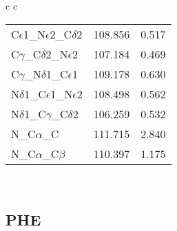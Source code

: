 \begin{longtable}{ c c }
\begin{tabular}{ l l l }
  C$\epsilon$1\_N$\epsilon$2\_C$\delta$2 & 108.856 & 0.517\\
  C$\gamma$\_C$\delta$2\_N$\epsilon$2 & 107.184 & 0.469\\
  C$\gamma$\_N$\delta$1\_C$\epsilon$1 & 109.178 & 0.630\\
  N$\delta$1\_C$\epsilon$1\_N$\epsilon$2 & 108.498 & 0.562\\
  N$\delta$1\_C$\gamma$\_C$\delta$2 & 106.259 & 0.532\\
  N\_C$\alpha$\_C & 111.715 & 2.840\\
  N\_C$\alpha$\_C$\beta$ & 110.397 & 1.175\\
  \bottomrule
  \end{tabular}
  \\
  
\end{longtable}    

\newpage
\subsection{PHE}

